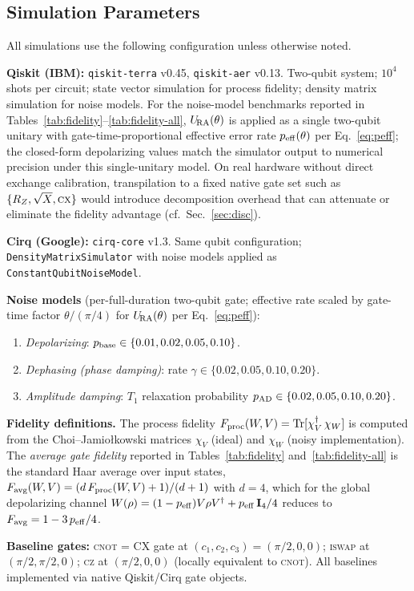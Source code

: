 \subsection{Simulation Parameters}
\label{app:sim-params}

All simulations use the following configuration unless otherwise noted.

\textbf{Qiskit (IBM):} \texttt{qiskit-terra} v0.45, \texttt{qiskit-aer} v0.13.
Two-qubit system; $10^4$ shots per circuit; state vector simulation for
process fidelity; density matrix simulation for noise models.
For the noise-model benchmarks reported in
Tables~\ref{tab:fidelity}--\ref{tab:fidelity-all}, $U_{\!\mathrm{RA}}(\theta)$ is
applied as a single two-qubit unitary with gate-time-proportional
effective error rate $p_{\rm eff}(\theta)$ per Eq.~\eqref{eq:peff};
the closed-form depolarizing values match the simulator output to
numerical precision under this single-unitary model.
On real hardware without direct exchange calibration, transpilation to
a fixed native gate set such as $\{R_Z, \sqrt{X}, \textsc{cx}\}$ would
introduce decomposition overhead that can attenuate or eliminate the
fidelity advantage (cf.\ Sec.~\ref{sec:disc}).

\textbf{Cirq (Google):} \texttt{cirq-core} v1.3.
Same qubit configuration; \texttt{DensityMatrixSimulator} with noise models
applied as \texttt{ConstantQubitNoiseModel}.

\textbf{Noise models}
(per-full-duration two-qubit gate; effective rate scaled by gate-time
factor $\theta/(\pi/4)$ for $U_{\!\mathrm{RA}}(\theta)$ per Eq.~\eqref{eq:peff}):
\begin{enumerate}
  \item \emph{Depolarizing}: $p_{\rm base} \in \{0.01, 0.02, 0.05, 0.10\}$.
  \item \emph{Dephasing (phase damping)}: rate $\gamma \in \{0.02, 0.05, 0.10, 0.20\}$.
  \item \emph{Amplitude damping}: $T_1$ relaxation probability
        $p_{\rm AD} \in \{0.02, 0.05, 0.10, 0.20\}$.
\end{enumerate}

\textbf{Fidelity definitions.}
The process fidelity $F_{\rm proc}(W,V) = \mathrm{Tr}[\chi_V^\dagger\,\chi_W]$
is computed from the Choi--Jamio\l{}kowski matrices $\chi_V$
(ideal) and $\chi_W$ (noisy implementation).
The \emph{average gate fidelity} reported in Tables~\ref{tab:fidelity}
and~\ref{tab:fidelity-all} is the standard Haar average over input
states,
$F_{\rm avg}(W,V) = (d\,F_{\rm proc}(W,V) + 1)/(d+1)$ with $d = 4$,
which for the global depolarizing channel
$W(\rho) = (1-p_{\rm eff})V\rho V^\dagger + p_{\rm eff}\,\mathbf{I}_4/4$
reduces to $F_{\rm avg} = 1 - 3\,p_{\rm eff}/4$.

\textbf{Baseline gates:} \textsc{cnot} = $\mathrm{CX}$ gate at $(c_1,c_2,c_3) = (\pi/2,0,0)$;
\textsc{iswap} at $(\pi/2,\pi/2,0)$; \textsc{cz} at $(\pi/2,0,0)$ (locally
equivalent to \textsc{cnot}).
All baselines implemented via native Qiskit/Cirq gate objects.
